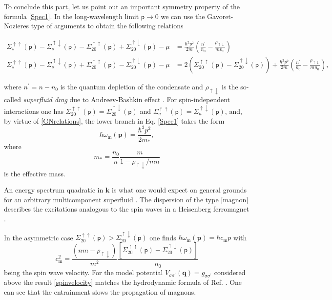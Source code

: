 \documentclass[reprint,superscriptaddress,showpacs,nofootinbib,aps,pra]{revtex4-1}
\begin{document}
To conclude this part, let us point out an important symmetry property of the formula \eqref{Spec1}. In the long-wavelength limit $\mathsf p\rightarrow 0$ we can use the Gavoret-Nozieres type of arguments \cite{Gavoret} to obtain the following relations
\begin{widetext}
\begin{subequations}
\label{GNrelations}
\begin{align}
\Sigma_s^{\uparrow\uparrow}(\mathsf p)-\Sigma_s^{\uparrow\downarrow}(\mathsf p)-\Sigma^{\uparrow \uparrow}_{20}(\mathsf p)+\Sigma^{\uparrow \downarrow}_{20}(\mathsf p)-\mu&=\frac{\hbar^2 p^2}{2m}\left(\frac{n^\prime}{n_0}-\frac{\rho_{\uparrow\downarrow}}{mn_0}\right)\\
\Sigma_s^{\uparrow\uparrow}(\mathsf p)-\Sigma_s^{\uparrow\downarrow}(\mathsf p)+\Sigma^{\uparrow \uparrow}_{20}(\mathsf p)-\Sigma^{\uparrow \downarrow}_{20}(\mathsf p)-\mu&=2(\Sigma^{\uparrow \uparrow}_{20}(\mathsf p)-\Sigma^{\uparrow \downarrow}_{20}(\mathsf p))+\frac{\hbar^2 p^2}{2m}\left(\frac{n^\prime}{n_0}-\frac{\rho_{\uparrow\downarrow}}{mn_0}\right),
\end{align}
\end{subequations}
\end{widetext}
where $n^\prime=n-n_0$ is the quantum depletion of the condensate and $\rho_{\uparrow\downarrow}$ is the so-called \textit{superfluid drag} due to Andreev-Bashkin effect \cite{AB, ABnote}. For spin-independent interactions one has $\Sigma^{\uparrow \uparrow}_{20}(\mathsf p)=\Sigma^{\uparrow \downarrow}_{20}(\mathsf p)$ and $\Sigma_a^{\uparrow\uparrow}(\mathsf p)=\Sigma_a^{\uparrow\downarrow}(\mathsf p)$, and, by virtue of \eqref{GNrelations}, the lower branch in Eq. \eqref{Spec1} takes the form
\begin{equation}
\label{magnon}
\hbar\omega_\mathrm{m} (\bm p)=\frac{\hbar^2 p^2}{2m_\ast},
\end{equation}
where
\begin{equation}
\label{magnonmass}
m_\ast=\frac{n_0}{n}\frac{m}{1-\rho_{\uparrow\downarrow}/mn}
\end{equation}
is the effective mass. 

An energy spectrum quadratic in $\bm k$ is what one would expect on general grounds for an arbitrary multicomponent superfluid \cite{Halperin1}. The dispersion of the type \eqref{magnon} describes the excitations analogous to the spin waves in a Heisenberg ferromagnet \cite{Halperin2}.

In the asymmetric case $\Sigma^{\uparrow \uparrow}_{20}(\mathsf p)>\Sigma^{\uparrow \downarrow}_{20}(\mathsf p)$ one finds $\hbar\omega_\mathrm{m} (\bm p)=\hbar c_\mathrm{m} p$ with
\begin{equation}
\label{spinvelocity}
c_\mathrm{m}^2=\frac{(nm-\rho_{\uparrow\downarrow})}{m^2}\frac{[\Sigma^{\uparrow \uparrow}_{20}(\mathsf p)-\Sigma^{\uparrow \downarrow}_{20}(\mathsf p)]}{n_0}
\end{equation}
being the spin wave velocity. For the model potential $V_{\sigma\sigma^\prime}(\bm q)=g_{\sigma\sigma^\prime}$ considered above the result \eqref{spinvelocity} matches the hydrodynamic formula of Ref. \cite{Nespolo}. One can see that the entrainment slows the propagation of magnons.     
\end{document}
